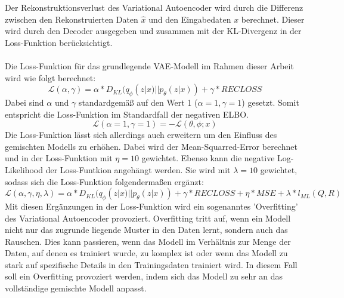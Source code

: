 \documentclass[%
thesis=student,%
coverpage=false,%
titlepage=false,%
headmarks=true, %
german,%
font=libertine, %
math=newpxtx, %
BCOR=5mm,%
coverBCOR=11mm%
]{tumbook}
\theoremstyle{break}
\begin{document}
Der Rekonstruktionsverlust des Variational Autoencoder wird durch die Differenz zwischen den Rekonstruierten Daten $\hat{x}$ und den Eingabedaten $x$ berechnet. Dieser wird durch den Decoder ausgegeben und zusammen mit der KL-Divergenz in der Loss-Funktion berücksichtigt. \\
\\
Die Loss-Funktion für das grundlegende VAE-Modell im Rahmen dieser Arbeit wird wie folgt berechnet:\\
$$ \mathcal{L}(\alpha, \gamma) = \alpha * D_{KL}(q_\phi(z|x)||p_\theta(z|x)) + \gamma * RECLOSS $$
Dabei sind $\alpha$ und $\gamma$ standardgemäß auf den Wert 1 ($\alpha=1, \gamma=1$) gesetzt. Somit entspricht die Loss-Funktion im Standardfall der negativen ELBO.
$$ \mathcal{L}(\alpha=1, \gamma=1) = - \mathcal{L}(\theta,\phi;x) $$
Die Loss-Funktion lässt sich allerdings auch erweitern um den Einfluss des gemischten Modells zu erhöhen. Dabei wird der Mean-Squarred-Error berechnet und in der Loss-Funktion mit $\eta = 10$ gewichtet. Ebenso kann die negative Log-Likelihood der Loss-Funtkion angehängt werden. Sie wird mit $\lambda = 10$ gewichtet, sodass sich die Loss-Funktion folgendermaßen ergänzt:
$$ \mathcal{L}(\alpha,\gamma,\eta,\lambda) = \alpha * D_{KL}(q_\phi(z|x)||p_\theta(z|x)) + \gamma * RECLOSS + \eta * MSE + \lambda * l_{ML}(Q,R)$$
Mit diesen Ergänzungen in der Loss-Funktion wird ein sogenanntes 'Overfitting' des Variational Autoencoder provoziert. Overfitting tritt auf, wenn ein Modell nicht nur das zugrunde liegende Muster in den Daten lernt, sondern auch das Rauschen. Dies kann passieren, wenn das Modell im Verhältnis zur Menge der Daten, auf denen es trainiert wurde, zu komplex ist oder wenn das Modell zu stark auf spezifische Details in den Trainingsdaten trainiert wird. In diesem Fall soll ein Overfitting provoziert werden, indem sich das Modell zu sehr an das vollständige gemischte Modell anpasst. 


\end{document}
